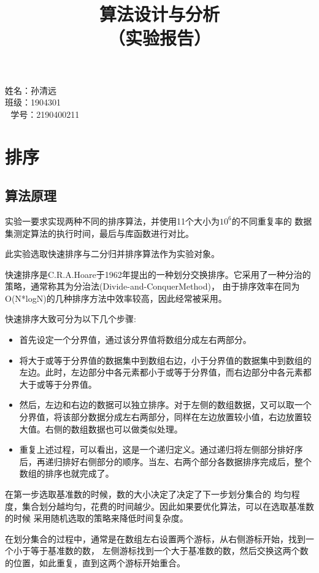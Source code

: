 \documentclass[UTF8]{ctexart}
\title{\vspace{-3cm}\textbf{\zihao{1}算法设计与分析}\\\zihao{2}（实验报告）\\\vspace{+10cm}}
\begin{document}
\date{}
\maketitle
\begin{center}
      姓名：孙清远\\班级：1904301\\ \quad\ \,学号：2190400211
\end{center}
\newpage
\section{排序}
\subsection{算法原理}
  实验一要求实现两种不同的排序算法，并使用11个大小为$10^6$的不同重复率的
  数据集测定算法的执行时间，最后与库函数进行对比。\par
  此实验选取快速排序与二分归并排序算法作为实验对象。\par
  快速排序是C.R.A.Hoare于1962年提出的一种划分交换排序。它采用了一种分治的策略，通常称其为分治法(Divide-and-ConquerMethod)，
  由于排序效率在同为O(N*logN)的几种排序方法中效率较高，因此经常被采用。\par
  快速排序大致可分为以下几个步骤:
  \begin{itemize}
      \item 首先设定一个分界值，通过该分界值将数组分成左右两部分。
      \item 将大于或等于分界值的数据集中到数组右边，小于分界值的数据集中到数组的左边。此时，左边部分中各元素都小于或等于分界值，而右边部分中各元素都大于或等于分界值。
      \item 然后，左边和右边的数据可以独立排序。对于左侧的数组数据，又可以取一个分界值，将该部分数据分成左右两部分，同样在左边放置较小值，右边放置较大值。右侧的数组数据也可以做类似处理。
      \item 重复上述过程，可以看出，这是一个递归定义。通过递归将左侧部分排好序后，再递归排好右侧部分的顺序。当左、右两个部分各数据排序完成后，整个数组的排序也就完成了。
  \end{itemize}
  \par
  在第一步选取基准数的时候，数的大小决定了决定了下一步划分集合的
  均匀程度，集合划分越均匀，花费的时间越少。因此如果要优化算法，可以在选取基准数的时候
  采用随机选取的策略来降低时间复杂度。 \par
  在划分集合的过程中，通常是在数组左右设置两个游标，从右侧游标开始，找到一个小于等于基准数的数，
  左侧游标找到一个大于基准数的数，然后交换这两个数的位置，如此重复，直到这两个游标开始重合。 \par
\end{document}

